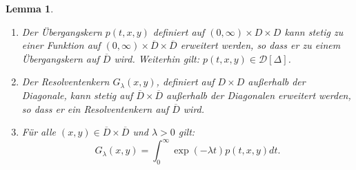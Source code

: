 \documentclass[10pt, a4paper, leqno, twoside, bibliography=totocnumbered, final]{scrartcl}
\theoremstyle{definition}
\theoremstyle{plain}%
\newtheorem{lemma}[defin]{Lemma}
\theoremstyle{remark}
\begin{document}
\begin{lemma}
\label{sec:lemma2}
\begin{enumerate}
\item[(i)] Der Übergangskern $ p(t,x,y) $ definiert auf $ (0, \infty ) \times D \times D $ kann stetig zu einer Funktion auf $ (0, \infty ) \times \overline{D} \times \overline{D} $ erweitert werden, so dass er zu einem Übergangskern auf $ \overline{D} $ wird. Weiterhin gilt: $ p(t,x,y) \in \mathcal{D}[\Delta] $.
\item[(ii)] Der Resolventenkern $ G_{\lambda}(x,y) $, definiert auf $ D \times D $ außerhalb der Diagonale, kann stetig auf $ \overline{D} \times \overline{D} $ außerhalb der Diagonalen erweitert werden, so dass er ein Resolventenkern auf $ \overline{D} $ wird.
\item[(iii)] Für alle $ (x,y) \in \overline{D} \times \overline{D} $ und $ \lambda > 0 $ gilt:
\begin{equation}
\label{eq:lemma2-G}
G_{\lambda}(x,y) = \int_0^{\infty}  \exp(-\lambda t) p(t,x,y) dt.
\end{equation}
\end{enumerate}
\end{lemma}
\end{document}
